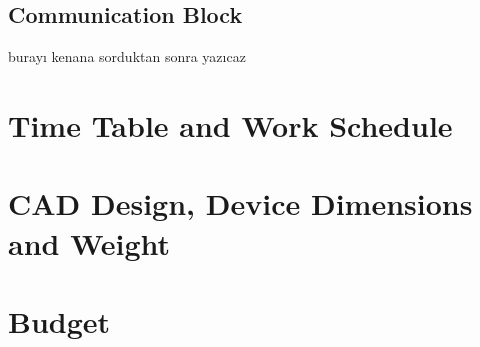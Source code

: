 \documentclass[12pt,a4paper]{article}
\begin{document}
   \subsection{Communication Block}
    \begin{flushleft}
     burayı kenana sorduktan sonra yazıcaz
    \end{flushleft}

 \section{Time Table and Work Schedule}
  \begin{flushleft}
   
  \end{flushleft}
  
 \section{CAD Design, Device Dimensions and Weight}
  \begin{flushleft}
   
  \end{flushleft}

 \section{Budget}
\end{document}
